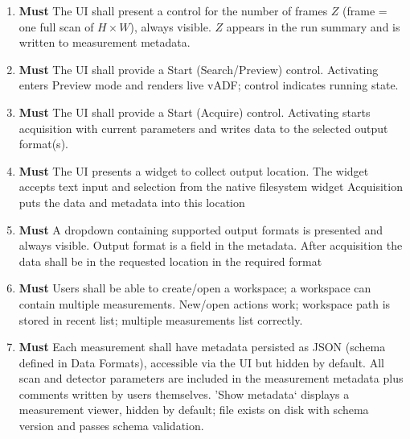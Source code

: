\documentclass[10pt]{article}
\newcommand{\PriorityTag}[2]{%
  \colorbox{#2!25}{\footnotesize\textsf{\textbf{#1}}}\hspace{0.6em}}
\newcommand{\must}{\leavevmode\PriorityTag{Must}{green}}
\newcounter{reqgrp}[section] %
\newcounter{reqno}
\newcommand{\reqprefix}{GEN}
\newenvironment{requirements}[1]{%
  \renewcommand{\reqprefix}{#1}%
  \refstepcounter{reqgrp}%
  \setcounter{reqno}{0}%
  \begin{enumerate}[leftmargin=*]
}{\end{enumerate}}
\begin{document}
\begin{requirements}{UI}
  \item \must {}
  {The UI shall present a control for the number of frames \(Z\) (frame = one full scan of \(H\times W\)), always visible.}
  {\(Z\) appears in the run summary and is written to measurement metadata.}

  \item \must {}
  {The UI shall provide a Start (Search/Preview) control.}
  {Activating enters Preview mode and renders live vADF; control indicates running state.}

  \item \must {}
  {The UI shall provide a Start (Acquire) control.}
  {Activating starts acquisition with current parameters and writes data to the selected output format(s).}

  \item \must {}
  {The UI presents a widget to collect output location. The widget accepts text input and selection from the native filesystem widget}
  {Acquisition puts the data and metadata into this location}

  \item \must {}
  {A dropdown containing supported output formats is presented and always visible.}
  {Output format is a field in the metadata. After acquisition the data shall be in the requested location in the required format}

  \item \must {}
  {Users shall be able to create/open a workspace; a workspace can contain multiple measurements.}
  {New/open actions work; workspace path is stored in recent list; multiple measurements list correctly.}

  \item \must {}
  {Each measurement shall have metadata persisted as JSON (schema defined in Data Formats), accessible via the UI but hidden by default. All scan and detector parameters are included in the measurement metadata plus comments written by users themselves.}
  {'Show metadata` displays a measurement viewer, hidden by default; file exists on disk with schema version and passes schema validation.}


\end{requirements}
\end{document}
